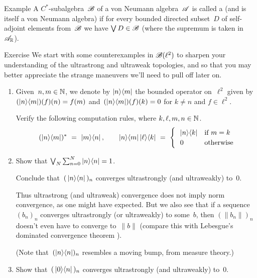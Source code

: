 \documentclass[a]{subfiles}
\begin{document}
\begin{parsec}%
\begin{point}{Example}%
A $C^*$-subalgebra~$\mathscr{B}$
of a von Neumann algebra~$\mathscr{A}$
is called a 
(and is itself a von Neumann algebra)
if for every bounded directed subset~$D$
of self-adjoint elements from~$\mathscr{B}$
we have $\bigvee D\in\mathscr{B}$
(where the supremum is taken in~$\mathscr{A}_{\mathbb{R}}$).
\end{point}

\end{parsec}
\begin{parsec}%
\begin{point}{Exercise}%
We start with some counterexamples in $\mathscr{B}(\ell^2)$
to sharpen your understanding of the ultrastrong and ultraweak topologies,
and so that you may better appreciate
the strange maneuvers we'll need to pull off later on.
\begin{enumerate}
\item
Given~$n,m\in \mathbb{N}$,
we denote by $\left|n\right>\!\left<m\right|$
the bounded operator on~$\ell^2$
given by $(\left|n\right>\!\left<m\right|)(f)(n)=f(m)$
and~$(\left|n\right>\!\left<m\right|)(f)(k)=0$ for $k\neq n$
and $f\in \ell^2$.

Verify the following computation rules,
where $k,\ell,m,n\in \mathbb{N}$.
\begin{equation*}
(\ketbra{n}{m})^*\ =\ \ketbra{m}{n},
\qquad
\ketbra{n}{m}\ketbra{\ell}{k}\ =\ 
\begin{cases}
\ \ \ketbra{n}{k} & \text{if $m=k$} \\
\ \ 0 & \text{otherwise}
\end{cases}
\end{equation*}
\item
Show that $\bigvee_N \sum_{n=0}^N \left|n\right>\!\left<n\right|=1$.

Conclude that~$(\,\left|n\right>\!\left<n\right|\,)_n$
converges ultrastrongly (and ultraweakly) to~$0$.

Thus ultrastrong (and ultraweak) convergence does not imply norm convergence,
as one might have expected.
But we also see that if a sequence~$(b_n)_n$ converges ultrastrongly
(or ultraweakly) to some~$b$,
then $(\|b_n\|)_n$ doesn't even have to converge to~$\|b\|$
(compare this with Lebesgue's dominated convergence
theorem ).

(Note that~$(\left|n\right>\!\left<n\right|)_n$ resembles a moving bump, from measure theory.)
\item
Show that~$(\,\left|0\right>\!\left<n\right|\,)_n$ converges ultrastrongly 
(and ultraweakly) to~$0$.


\end{enumerate}
\end{point}
\end{parsec}
\end{document}
